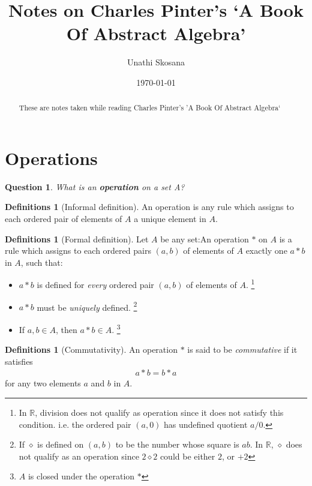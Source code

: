 \documentclass[nohyper,nobib]{tufte-handout}
\title{Notes on Charles Pinter's `A Book Of Abstract Algebra'} %
\author{Unathi Skosana}
\date{\vspace{-5pt}\normalsize \today} %
\newtheorem{quest}[thm]{Question}
\theoremstyle{definition}
\newtheorem{defns}[thm]{Definitions}
\theoremstyle{remark}
\begin{document}
\justifying 
\maketitle

\begin{abstract}
\noindent
These are notes taken while reading Charles Pinter's 'A Book Of Abstract Algebra`
\end{abstract}

\tableofcontents

\section{Operations}

\begin{quest}
	What is an \textbf{operation} on a set A?
\end{quest}

\begin{defns}[Informal definition]
    An operation is any rule which assigns to each ordered pair of elements of $A$ a unique element in $A$.
\end{defns}

\begin{defns}[Formal definition]
	Let $A$ be any set:\newline An operation $*$ on $A$ is a rule which assigns to each ordered pairs $(a,b)$ of elements of $A$ exactly one $a * b$ in $A$, such that:
    \begin{itemize}
        \item $a * b$ is defined for \emph{every} ordered pair $(a,b)$ of elements of $A$. \footnote{In $\mathbb{R}$, division does not qualify as operation since it does not satisfy this condition. i.e. the ordered pair $(a, 0)$ has undefined quotient $a / 0$.}
        \item $a * b$ must be \emph{uniquely} defined. \footnote{If $\diamond$ is defined on $(a, b)$ to be the number whose square is $ab$. In $\mathbb{R}$, $\diamond$ does not qualify as an operation since $2 \diamond 2$  could be either $2$, or $+2$}
        \item If $a, b \in A$, then $a * b \in A$. \footnote{$A$ is closed under the operation $*$}
    \end{itemize}
\end{defns}

    
\begin{defns}[Commutativity]
    An operation $*$ is said to be \emph{commutative} if it satisfies
    \begin{align}
        a * b  = b * a
    \end{align}
    for any two elements $a$ and $b$ in $A$.
\end{defns}
\end{document}
